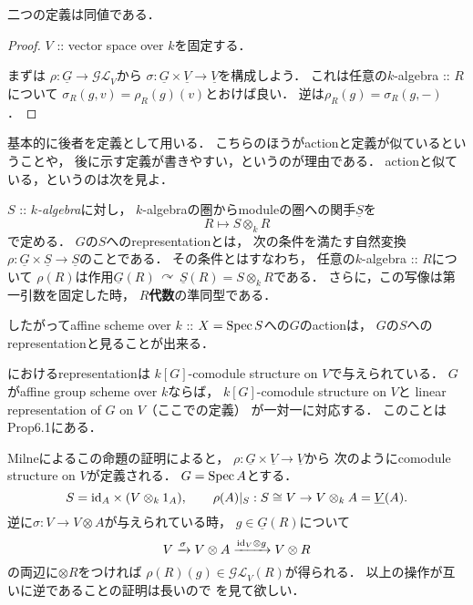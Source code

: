 \documentclass[a4paper]{jsarticle}
\newcommand{\func}[1]{\underline{#1}}
\newcommand{\ftorGL}{\mathcal{GL}}
\newcommand{\acton}{\,\curvearrowright\,}
\begin{document}
    \begin{Prop}
        二つの定義は同値である．
    \end{Prop}
    \begin{proof}
        $V$ :: vector space over $k$を固定する．

        まずは
        $\rho: \func{G} \to \ftorGL_V$から
        $\sigma: \func{G} \times \func{V} \to \func{V}$を構成しよう．
        これは任意の$k$-algebra :: $R$について
        $\sigma_R(g,v)=\rho_R(g)(v)$とおけば良い．
        逆は$\rho_R(g)=\sigma_R(g, -)$．
    \end{proof}
    基本的に後者を定義として用いる．
    こちらのほうがactionと定義が似ているということや，
    後に示す定義が書きやすい，というのが理由である．
    actionと似ている，というのは次を見よ．
    
    \begin{Def}
        $S$ :: \textit{$k$-algebra}に対し，
        $k$-algebraの圏からmoduleの圏への関手$\func{S}$を
        \[ R \mapsto S \otimes_k R \]
        で定める．
        $G$の$S$へのrepresentationとは，
        次の条件を満たす自然変換
        $\rho: \func{G} \times \func{S} \to \func{S}$のことである．
        その条件とはすなわち，
        任意の$k$-algebra :: $R$について
        $\rho(R)$は作用$\func{G}(R) \acton \func{S}(R)=S \otimes_k R$である．
        さらに，この写像は第一引数を固定した時，
        $R$\textbf{代数}の準同型である．
    \end{Def}
    したがってaffine scheme over $k$ :: $X=\Spec S$への$G$のactionは，
    $G$の$S$へのrepresentationと見ることが出来る．

    \begin{Remark}
        \cite{Muk1}におけるrepresentationは
        $k[G]$-comodule structure on $V$で与えられている．
        $G$がaffine group scheme over $k$ならば，
        $k[G]$-comodule structure on $V$と
        linear representation of $G$ on $V$（ここでの定義）
        が一対一に対応する．
        このことは\cite{MilneAGS} Prop6.1にある．

        Milneによるこの命題の証明によると，
        $\rho: \func{G} \times \func{V} \to \func{V}$から
        次のようにcomodule structure on $V$が定義される．
        $G=\Spec A$とする．
        \[
            S=\id[A] \times (V \otimes_k 1_A),
            \qquad
            \rho(A)|_{S}: S \iso V \to V \otimes_k A=\func{V}(A).
        \]
        逆に$\sigma: V \to V \otimes A$が与えられている時，
        $g \in \func{G}(R)$について
        \[ V \xrightarrow{\sigma} V \otimes A \xrightarrow{\id[V] \otimes g} V \otimes R \]
        の両辺に$\otimes R$をつければ
        $\rho(R)(g) \in \ftorGL_V(R)$が得られる．
        以上の操作が互いに逆であることの証明は長いので
        \cite{MilneAGS}を見て欲しい．
    \end{Remark}
\end{document}
